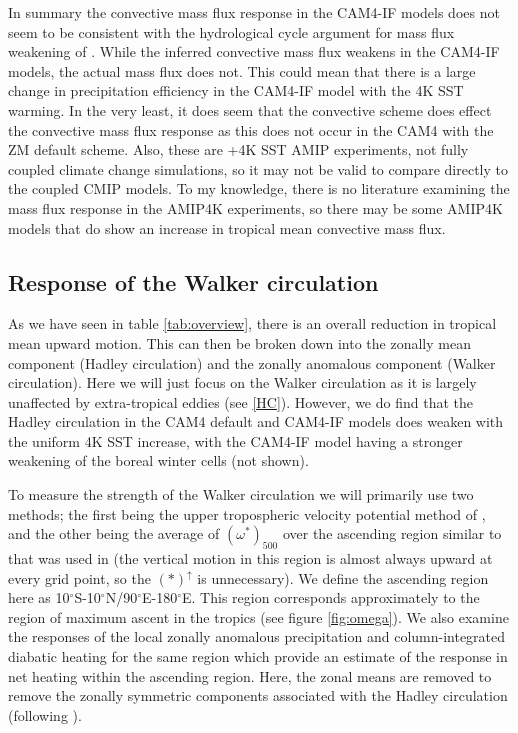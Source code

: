 \documentclass[letterpaper,12pt,titlepage,oneside,final]{book}
\begin{document}
In summary the convective mass flux response in the CAM4-IF models does not seem to be consistent with the hydrological cycle argument for mass flux weakening of \citep{held_robust_2006}. While the inferred convective mass flux weakens in the CAM4-IF models, the actual mass flux does not. This could mean that there is a large change in precipitation efficiency in the CAM4-IF model with the 4K SST warming. In the very least, it does seem that the convective scheme does effect the convective mass flux response as this does not occur in the CAM4 with the ZM default scheme. Also, these are +4K SST AMIP experiments, not fully coupled climate change simulations, so it may not be valid to compare directly to the coupled CMIP models. To my knowledge, there is no literature examining the mass flux response in the AMIP4K experiments, so there may be some AMIP4K models that do show an increase in tropical mean convective mass flux.

\subsection{Response of the Walker circulation} 

As we have seen in table \ref{tab:overview}, there is an overall reduction in tropical mean upward motion. This can then be broken down into the zonally mean component (Hadley circulation) and the zonally anomalous component (Walker circulation). Here we will just focus on the Walker circulation as it is largely unaffected by extra-tropical eddies (see \ref{HC}). However, we do find that the Hadley circulation in the CAM4 default and CAM4-IF models does weaken with the uniform 4K SST increase, with the CAM4-IF model having a stronger weakening of the boreal winter cells (not shown).

To measure the strength of the Walker circulation we will primarily use two methods; the first being the upper tropospheric velocity potential method of \citep{tanaka_trend_2004}, and the other being the average of $(\omega^{*})_{500}$ over the ascending region similar to that was used in \citep{wills_local_2017} (the vertical motion in this region is almost always upward at every grid point, so the $(*)^{\uparrow}$ is unnecessary). We define the ascending region here as 10$^{\circ}$S-10$^{\circ}$N/90$^{\circ}$E-180$^{\circ}$E. This region corresponds approximately to the region of maximum ascent in the tropics (see figure \ref{fig:omega}). We also examine the responses of the local zonally anomalous precipitation and column-integrated diabatic heating for the same region which provide an estimate of the response in net heating within the ascending region. Here, the zonal means are removed to remove the zonally symmetric components associated with the Hadley circulation (following \cite{wills_local_2017}).
\end{document}
